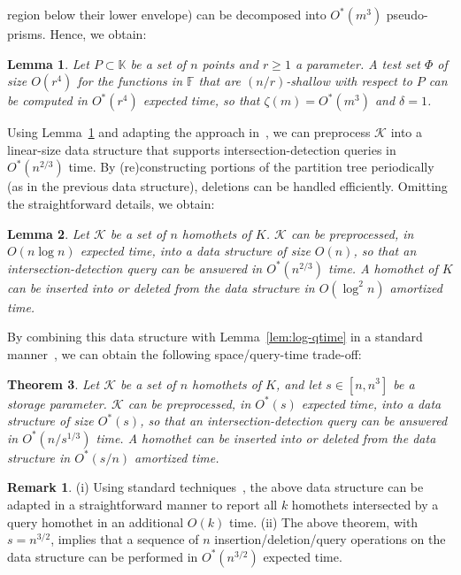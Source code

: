 \documentclass[11pt]{article}
\newif\iffullver
\def\Fspace{{\mathbb F}}
\def\Kspace{{\mathbb K}}
\def\K{\mathcal{K}}
\newtheorem{theorem}{Theorem}[section]
\newtheorem{lemma}[theorem]{Lemma}
\theoremstyle{definition}
\newtheorem{remark}{Remark}
\begin{document}
region below their lower envelope) can be decomposed into $O^*(m^3)$ pseudo-prisms. Hence, we obtain:
\begin{lemma} \label{lem:btest}
Let $P\subset \Kspace$ be a set of $n$ points and $r\ge 1$ a parameter. A test set $\Phi$ 
	of size $O(r^4)$ for the functions in $\Fspace$ that are $(n/r)$-shallow 
	with respect to $P$ can be computed in $O^*(r^4)$ expected time, so that
	$\zeta(m)=O^*(m^3)$ and $\delta=1$.
\end{lemma}
%
Using Lemma~\ref{lem:btest} and adapting the approach in~\cite{ShSh}, we can preprocess $\K$ into
a linear-size data structure that supports intersection-detection queries in $O^*(n^{2/3})$ time. 
By (re)constructing portions of the partition tree periodically (as in the previous data structure), 
deletions can be handled efficiently. Omitting the straightforward details, we obtain:
%
\begin{lemma}
	\label{lem:linear-qtime}
Let $\K$ be a set of $n$ homothets of $K$.  $\K$ can be preprocessed,
in $O(n\log n)$ expected time, into a data structure of size $O(n)$, so that an intersection-detection query 
can be answered in $O^*(n^{2/3})$ time. A homothet of $K$ 
can be inserted into or deleted from the data structure in $O(\log^2 n)$ amortized time.
\end{lemma}
%
By combining this data structure with Lemma~\ref{lem:log-qtime} in a 
standard manner~\cite{AAEKS}, we can 
obtain the following space/query-time trade-off:
\begin{theorem}
	\label{thm:tradeoff}
	Let $\K$ be a set of $n$ homothets of $K$, and let $s\in[n,n^3]$ be a storage parameter.  
        $\K$ can be preprocessed, in $O^*(s)$ expected time, into a data structure of size $O^*(s)$, so 
	that an intersection-detection query can be answered 
	in $O^*(n/s^{1/3})$ time. A homothet can be inserted into 
	or deleted from the data structure in $O^*(s/n)$ amortized time.
\end{theorem}
%
\iffullver
\begin{remark} 
	\label{rem:ds}
	(i) Using standard techniques~\cite{Mat92,AM95}, the above data structure can be adapted in a 
        straightforward manner to report all $k$ homothets intersected by 
	a query homothet in an additional $O(k)$ time.
%
	(ii) The above theorem, with $s = n^{3/2}$, implies that a sequence of $n$ insertion/deletion/query 
        operations on the data structure can be performed in $O^*(n^{3/2})$ expected time.
\end{remark}
\end{document}
